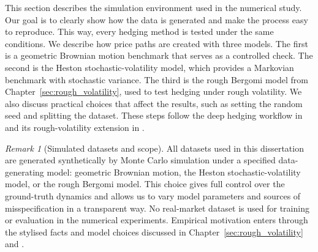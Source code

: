 \documentclass[12pt,a4paper]{article}
\theoremstyle{definition}
\theoremstyle{plain}
\theoremstyle{remark}
\newtheorem{remark}{Remark}[section]
\theoremstyle{plain}
\begin{document}
This section describes the simulation environment used in the numerical study.
Our goal is to clearly show how the data is generated and make the process easy to reproduce. This way, every hedging method is tested under the same conditions.
We describe how price paths are created with three models. The first is a geometric Brownian motion benchmark that serves as a controlled check. The second is the Heston stochastic-volatility model, which provides a Markovian benchmark with stochastic variance. The third is the rough Bergomi model from Chapter~\ref{sec:rough_volatility}, used to test hedging under rough volatility.
We also discuss practical choices that affect the results, such as setting the random seed and splitting the dataset. These steps follow the deep hedging workflow in \cite{Buehler2019DeepHedging} and its rough-volatility extension in \cite{Horvath2021DeepRough}.

\begin{remark}[Simulated datasets and scope]
\label{rem:sim_vs_real_data}
All datasets used in this dissertation are generated synthetically by Monte Carlo simulation under a specified data-generating model: geometric Brownian motion, the Heston stochastic-volatility model, or the rough Bergomi model. This choice gives full control over the ground-truth dynamics and allows us to vary model parameters and sources of misspecification in a transparent way.
No real-market dataset is used for training or evaluation in the numerical experiments. Empirical motivation enters through the stylised facts and model choices discussed in Chapter~\ref{sec:rough_volatility} \cite{GatheralRough} and \cite{BayerFriz2016}.
\end{remark}
\end{document}
